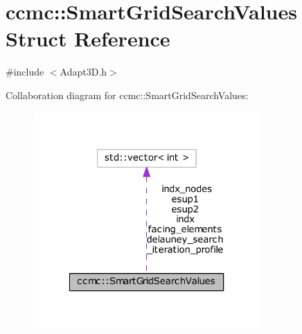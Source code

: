 \hypertarget{structccmc_1_1_smart_grid_search_values}{\section{ccmc\-:\-:Smart\-Grid\-Search\-Values Struct Reference}
\label{structccmc_1_1_smart_grid_search_values}
}


{\ttfamily \#include $<$Adapt3\-D.\-h$>$}



Collaboration diagram for ccmc\-:\-:Smart\-Grid\-Search\-Values\-:\nopagebreak
\begin{figure}[H]
\begin{center}
\leavevmode
\includegraphics[width=247pt]{structccmc_1_1_smart_grid_search_values__coll__graph}
\end{center}
\end{figure}
